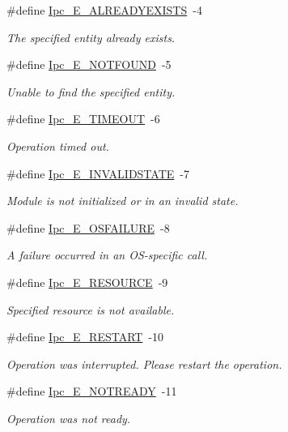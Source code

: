 \begin{DoxyCompactItemize}
\#define \hyperlink{_ipc_8h_a31205e4f4d3cc31cc615926d466e920b}{Ipc\_\-E\_\-ALREADYEXISTS}~-\/4
\begin{DoxyCompactList}\small\item\em The specified entity already exists. \item\end{DoxyCompactList}\item 
\#define \hyperlink{_ipc_8h_ab511d4936c15fb4ad724a6c457af45a2}{Ipc\_\-E\_\-NOTFOUND}~-\/5
\begin{DoxyCompactList}\small\item\em Unable to find the specified entity. \item\end{DoxyCompactList}\item 
\#define \hyperlink{_ipc_8h_a5ec546ed4e07fc5d8215ebdf8fee65d0}{Ipc\_\-E\_\-TIMEOUT}~-\/6
\begin{DoxyCompactList}\small\item\em Operation timed out. \item\end{DoxyCompactList}\item 
\#define \hyperlink{_ipc_8h_acebc3658919077d62e56e7e88247fa22}{Ipc\_\-E\_\-INVALIDSTATE}~-\/7
\begin{DoxyCompactList}\small\item\em Module is not initialized or in an invalid state. \item\end{DoxyCompactList}\item 
\#define \hyperlink{_ipc_8h_ae747ac1c4d39501d31ed73c09db1fd30}{Ipc\_\-E\_\-OSFAILURE}~-\/8
\begin{DoxyCompactList}\small\item\em A failure occurred in an OS-\/specific call. \item\end{DoxyCompactList}\item 
\#define \hyperlink{_ipc_8h_a80f32a1da0accc7f1636b7e875cb731a}{Ipc\_\-E\_\-RESOURCE}~-\/9
\begin{DoxyCompactList}\small\item\em Specified resource is not available. \item\end{DoxyCompactList}\item 
\#define \hyperlink{_ipc_8h_acaf8edc10dc7b47670564739d63f6657}{Ipc\_\-E\_\-RESTART}~-\/10
\begin{DoxyCompactList}\small\item\em Operation was interrupted. Please restart the operation. \item\end{DoxyCompactList}\item 
\#define \hyperlink{_ipc_8h_af61be5fb093e7cd7cb076afc8b2fe798}{Ipc\_\-E\_\-NOTREADY}~-\/11
\begin{DoxyCompactList}\small\item\em Operation was not ready. \item\end{DoxyCompactList}\end{DoxyCompactItemize}
